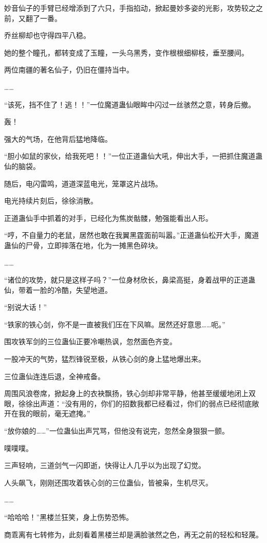 \begin{this_body}
妙音仙子的手臂已经增添到了六只，手指掐动，掀起曼妙多姿的光影，攻势较之之前，又翻了一番。

乔丝柳却也守得四平八稳。

她的整个瞳孔，都转变成了玉瞳，一头乌黑秀，变作根根细柳枝，垂至腰间。

两位南疆的著名仙子，仍旧在僵持当中。

……

“该死，挡不住了！逃！！”一位魔道蛊仙眼眸中闪过一丝骇然之意，转身后撤。

轰！

强大的气场，在他背后猛地降临。

“胆小如鼠的家伙，给我死吧！！”一位正道蛊仙大吼，伸出大手，一把抓住魔道蛊仙的脑袋。

随后，电闪雷鸣，道道深蓝电光，笼罩这片战场。

电光持续片刻后，徐徐消散。

正道蛊仙手中抓着的对手，已经化为焦炭骷髅，勉强能看出人形。

“哼，不自量力的老鼠，居然也敢在我翼黑霆面前叫嚣。”正道蛊仙松开大手，魔道蛊仙的尸骨，立即摔落在地，化为一摊黑色碎块。

……

“诸位的攻势，就只是这样子吗？”一位身材欣长，鼻梁高挺，身着战甲的正道蛊仙，带着一脸的冷酷，失望地道。

“别说大话！”

“铁家的铁心剑，你不是一直被我们压在下风嘛。居然还好意思……呃。”

围攻铁军剑的三位蛊仙正要冷嘲热讽，忽然面色齐变。

一股冲天的气势，猛烈锋锐至极，从铁心剑的身上猛地爆出来。

三位蛊仙连连后退，全神戒备。

周围风浪卷席，掀起身上的衣袂飘扬，铁心剑却非常平静，他甚至缓缓地闭上双眼，徐徐出声道：“没有用的，你们的招数我都已经看过，你们的弱点已经彻底敞开在我的眼前，毫无遮掩。”

“放你娘的……”一位蛊仙出声咒骂，但他没有说完，忽然全身狠狠一颤。

噗噗噗。

三声轻响，三道剑气一闪即逝，快得让人几乎以为出现了幻觉。

人头飙飞，刚刚还围攻着铁心剑的三位蛊仙，皆被枭，生机尽灭。

……

“哈哈哈！”黑楼兰狂笑，身上伤势恐怖。

商乖离有七转修为，此刻看着黑楼兰却是满脸骇然之色，再无之前的轻松和轻蔑。


\end{this_body}

